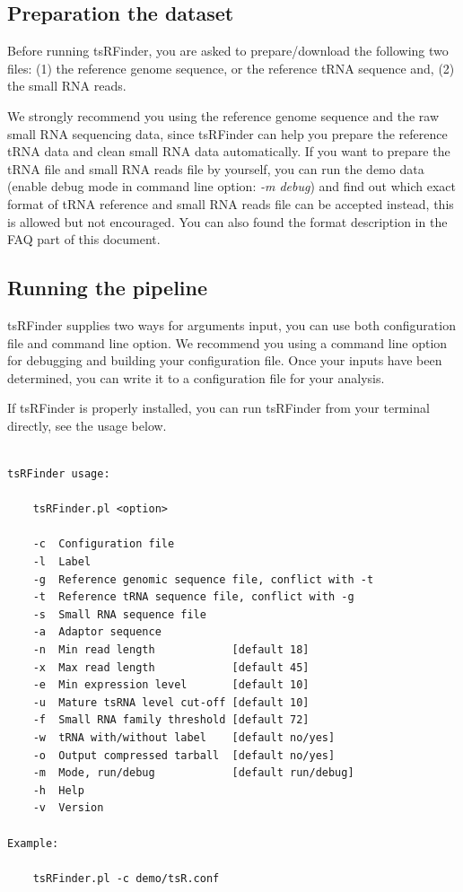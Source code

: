 \documentclass[11pt, a4paper]{article}
\begin{document}
\subsection{Preparation the dataset}

Before running tsRFinder, you are asked to prepare/download the following two files: (1) the reference genome sequence, or the reference tRNA sequence and, (2) the small RNA reads.

We strongly recommend you using the reference genome sequence and the raw small RNA sequencing data, since tsRFinder can help you prepare the reference tRNA data and clean small RNA data automatically. If you want to prepare the tRNA file and small RNA reads file by yourself, you can run the demo data (enable debug mode in command line option: \emph{-m debug}) and find out which exact format of tRNA reference and small RNA reads file can be accepted instead, this is allowed but not encouraged. You can also found the format description in the FAQ part of this document.

\subsection{Running the pipeline}

tsRFinder supplies two ways for arguments input, you can use both configuration file and command line option. We recommend you using a command line option for debugging and building your configuration file. Once your inputs have been determined, you can write it to a configuration file for your analysis.

If tsRFinder is properly installed, you can run tsRFinder from your terminal directly, see the usage below.

{\scriptsize \begin{tcolorbox}[colback=blue!5!white,colframe=blue!75!black,title=Usage of tsRFinder: ./tsRFinder.pl -h]
\begin{verbatim}

tsRFinder usage:

    tsRFinder.pl <option>

    -c  Configuration file
    -l  Label
    -g  Reference genomic sequence file, conflict with -t
    -t  Reference tRNA sequence file, conflict with -g
    -s  Small RNA sequence file
    -a  Adaptor sequence
    -n  Min read length            [default 18]
    -x  Max read length            [default 45]
    -e  Min expression level       [default 10]
    -u  Mature tsRNA level cut-off [default 10]
    -f  Small RNA family threshold [default 72]
    -w  tRNA with/without label    [default no/yes]
    -o  Output compressed tarball  [default no/yes]
    -m  Mode, run/debug            [default run/debug]
    -h  Help
    -v  Version

Example:

    tsRFinder.pl -c demo/tsR.conf

\end{verbatim}
\end{tcolorbox}}
\end{document}
